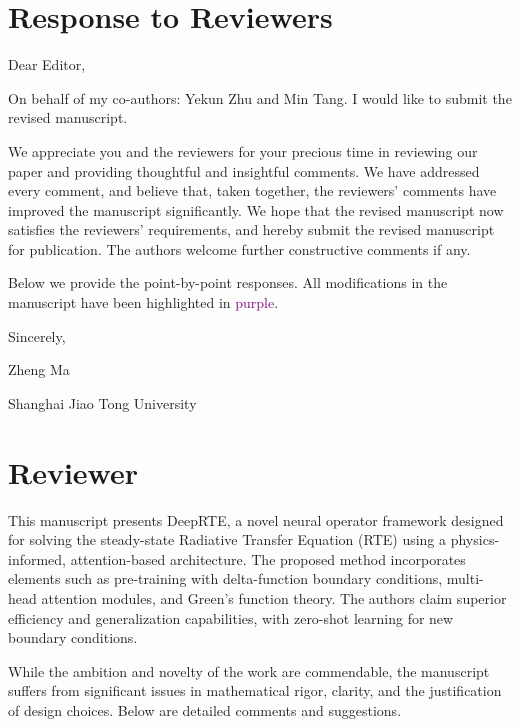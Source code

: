 \documentclass[12pt]{article}
\newcounter{reviewer}
\newcounter{point}[reviewer]
\newcommand{\reviewersection}{\stepcounter{reviewer} \bigskip
\section*{Reviewer \thereviewer}}
\newenvironment{Comment}{ \bigskip \noindent  {\textbf{[General Comment]}}  } {\par }
\begin{document}
\section*{Response to Reviewers}

\begin{flushleft}
	Dear Editor,
\end{flushleft}

On behalf of my co-authors: Yekun Zhu and Min Tang. I would like to submit the revised manuscript.

We appreciate you and the reviewers for your precious time in reviewing our paper and providing thoughtful and insightful comments.
We have addressed every comment, and believe that, taken together, the reviewers' comments have improved the manuscript significantly.
We hope that the revised manuscript now satisfies the reviewers' requirements, and hereby submit the revised manuscript for publication.
The authors welcome further constructive comments if any.

Below we provide the point-by-point responses. All modifications in the manuscript have been highlighted in \textcolor{purple}{purple}.

\begin{flushleft}
	Sincerely,

	Zheng Ma

	Shanghai Jiao Tong University
\end{flushleft}

\newpage

\reviewersection{}
\begin{Comment}
	This manuscript presents DeepRTE, a novel neural operator framework designed for solving the steady-state Radiative Transfer Equation (RTE) using a physics-informed, attention-based architecture. The proposed method incorporates elements such as pre-training with delta-function boundary conditions, multi-head attention modules, and Green’s function theory. The authors claim superior efficiency and generalization capabilities, with zero-shot learning for new boundary conditions.

	While the ambition and novelty of the work are commendable, the manuscript suffers from significant issues in mathematical rigor, clarity, and the justification of design choices. Below are detailed comments and suggestions.
\end{Comment}
\end{document}
